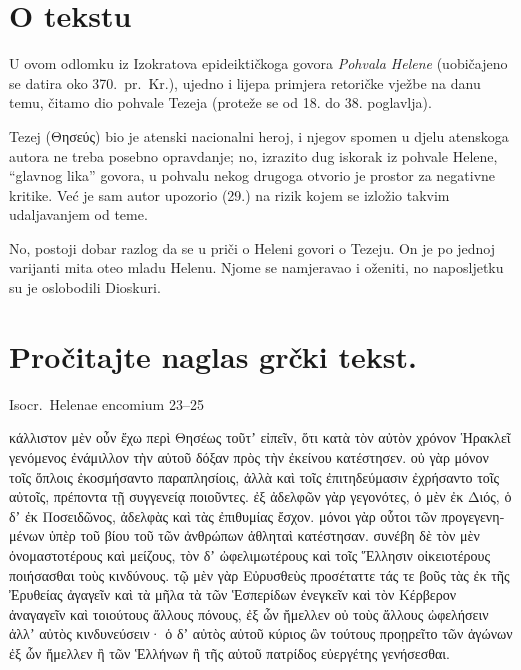 
\section*{O tekstu}

U ovom odlomku iz Izokratova epideiktičkoga govora \textit{Pohvala Helene} (uobičajeno se datira oko 370.\ pr.~Kr.), ujedno i lijepa primjera retoričke vježbe na danu temu, čitamo dio pohvale Tezeja (proteže se od 18. do 38. poglavlja). 

Tezej (Θησεύς) bio je atenski nacionalni heroj, i njegov spomen u djelu atenskoga autora ne treba posebno opravdanje; no, izrazito dug iskorak iz pohvale Helene, ``glavnog lika'' govora, u pohvalu nekog drugoga otvorio je prostor za negativne kritike. Već je sam autor upozorio (29.) na rizik kojem se izložio takvim udaljavanjem od teme.
 
No, postoji dobar razlog da se u priči o Heleni govori o Tezeju. On je po jednoj varijanti mita oteo mladu Helenu.  Njome se namjeravao i oženiti, no naposljetku su je oslobodili Dioskuri.


\section*{Pročitajte naglas grčki tekst.}

Isocr.\ Helenae encomium 23–25


\medskip


{\large

\begin{greek}

\noindent κάλλιστον μὲν οὖν ἔχω περὶ Θησέως τοῦτʼ εἰπεῖν, ὅτι κατὰ τὸν αὐτὸν χρόνον Ἡρακλεῖ γενόμενος ἐνάμιλλον τὴν αὑτοῦ δόξαν πρὸς τὴν ἐκείνου κατέστησεν. οὐ γὰρ μόνον τοῖς ὅπλοις ἐκοσμήσαντο παραπλησίοις, ἀλλὰ καὶ τοῖς ἐπιτηδεύμασιν ἐχρήσαντο τοῖς αὐτοῖς, πρέποντα τῇ συγγενείᾳ ποιοῦντες. ἐξ ἀδελφῶν γὰρ γεγονότες, ὁ μὲν ἐκ Διός, ὁ δʼ ἐκ Ποσειδῶνος, ἀδελφὰς καὶ τὰς ἐπιθυμίας ἔσχον. μόνοι γὰρ οὗτοι τῶν προγεγενημένων ὑπὲρ τοῦ βίου τοῦ τῶν ἀνθρώπων ἀθληταὶ κατέστησαν. συνέβη δὲ τὸν μὲν ὀνομαστοτέρους καὶ μείζους, τὸν δʼ ὠφελιμωτέρους καὶ τοῖς Ἕλλησιν οἰκειοτέρους ποιήσασθαι τοὺς κινδύνους. τῷ μὲν γὰρ Εὐρυσθεὺς προσέταττε τάς τε βοῦς τὰς ἐκ τῆς Ἐρυθείας ἀγαγεῖν καὶ τὰ μῆλα τὰ τῶν Ἑσπερίδων ἐνεγκεῖν καὶ τὸν Κέρβερον ἀναγαγεῖν καὶ τοιούτους ἄλλους πόνους, ἐξ ὧν ἤμελλεν οὐ τοὺς ἄλλους ὠφελήσειν ἀλλʼ αὐτὸς κινδυνεύσειν· ὁ δʼ αὐτὸς αὑτοῦ κύριος ὢν τούτους προῃρεῖτο τῶν ἀγώνων ἐξ ὧν ἤμελλεν ἢ τῶν Ἑλλήνων ἢ τῆς αὑτοῦ πατρίδος εὐεργέτης γενήσεσθαι.

\end{greek}

}


